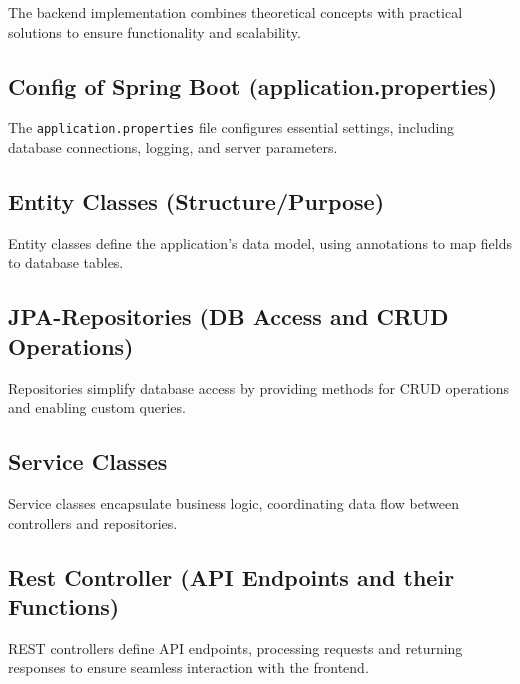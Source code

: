 \Author{\daAuthorThree}

    The backend implementation combines theoretical concepts with practical solutions to ensure functionality and scalability.

    \subsection{Config of Spring Boot (application.properties)}
    The \texttt{application.properties} file configures essential settings, including database connections, logging, and server parameters.

    \subsection{Entity Classes (Structure/Purpose)}
    Entity classes define the application's data model, using annotations to map fields to database tables.

    \subsection{JPA-Repositories (DB Access and CRUD Operations)}
    Repositories simplify database access by providing methods for CRUD operations and enabling custom queries.

    \subsection{Service Classes}
    Service classes encapsulate business logic, coordinating data flow between controllers and repositories.

    \subsection{Rest Controller (API Endpoints and their Functions)}
    REST controllers define API endpoints, processing requests and returning responses to ensure seamless interaction with the frontend.

    \newpage